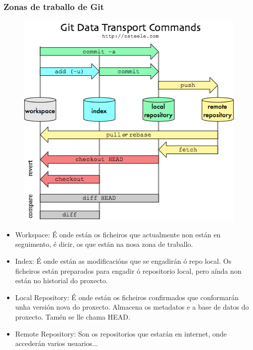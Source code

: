 \begin{frame}[fragile]
	\frametitle{Zonas de traballo de Git}
	\begin{multicols}{2}
		\begin{figure}
		\centering
		\includegraphics[width=1\linewidth]{./img/flujo-git}
		\label{fig:flujo-git}
		\end{figure}
		\columnbreak
		\tiny
		\begin{itemize}
			\item Workspace: É onde están os ficheiros que actualmente non están en seguimento, é dicir, os que están na nosa zona de traballo.
			\item Index: É onde están as modificacións que se engadirán ó repo local. Os ficheiros están preparados para engadir ó repositorio local, pero aínda non están no historial do proxecto. 
			\item Local Repository: É onde están os ficheiros confirmados que conformarán unha versión nova do proxecto. Almacena os metadatos e a base de datos do proxecto. Tamén se lle chama HEAD.
			\item Remote Repository: Son os repositorios que estarán en internet, onde accederán varios usuarios...
		\end{itemize}
	\end{multicols}
\end{frame}


